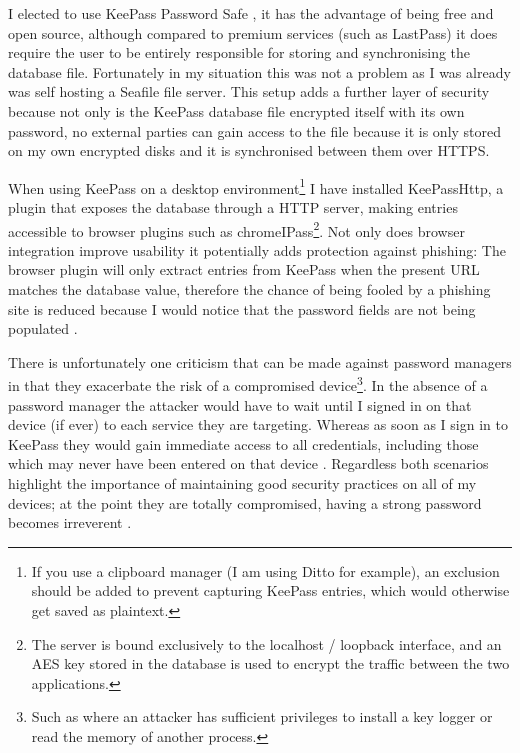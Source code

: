 \documentclass[11pt,a4paper]{scrartcl}
\begin{document}
\begin{refsection}
I elected to use KeePass Password Safe \cite{keepass}, it has the advantage of being free and open source, although compared to premium services (such as LastPass) it does require the user to be entirely responsible for storing and synchronising the database file. Fortunately in my situation this was not a problem as I was already was self hosting a Seafile file server. This setup adds a further layer of security because not only is the KeePass database file encrypted itself with its own password, no external parties can gain access to the file because it is only stored on my own encrypted disks and it is synchronised between them over HTTPS.

When using KeePass on a desktop environment\footnote{If you use a clipboard manager (I am using Ditto for example), an exclusion should be added to prevent capturing KeePass entries, which would otherwise get saved as plaintext.} 
I have installed KeePassHttp, a plugin that exposes the database through a HTTP server, making entries accessible to browser plugins such as chromeIPass\footnote{The server is bound exclusively to the localhost / loopback interface, and an AES key stored in the database is used to encrypt the traffic between the two applications.}. Not only does browser integration improve usability it  potentially adds protection against phishing: The browser plugin will only extract entries from KeePass when the present URL matches the database value, therefore the chance of being fooled by a phishing site is reduced because I would notice that the password fields are not being populated \cite{ncsc_pass_managers}.

There is unfortunately one criticism that can be made against password managers in that they exacerbate the risk of a compromised device\footnote{Such as where an attacker has sufficient privileges to install a key logger or read the memory of another process.}.
In the absence of a password manager the attacker would have to wait until I signed in on that device (if ever) to each service they are targeting. 
Whereas as soon as I sign in to KeePass they would gain immediate access to all credentials, including those which may never have been entered on that device \cite{citadel_keepass}. Regardless both scenarios highlight the importance of maintaining good security practices on all of my devices; at the point they are totally compromised, having a strong password becomes irreverent \cite{nist_password_2017}.

\printbibliography
\end{refsection}
\end{document}
